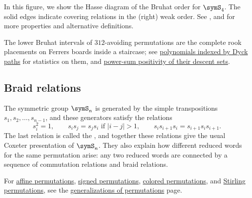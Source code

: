\begin{figure}
\end{figure}

In this figure, we show the Hasse diagram of the Bruhat order for $\symS_4$.
The solid edges indicate covering relations in the (right) weak order.
See \cite[Ch.~10.5]{Fulton1997}, \cite[Exs.~183 and 185]{StanleyEC1}
and \cite[Chs.~2--3]{Bjorner2005} for more properties
and alternative definitions.

The lower Bruhat intervals of $312$-avoiding permutations are the complete rook
placements on Ferrers boards inside a staircase; see
\hyperref[dyckPathBruhatPolynomials]{polynomials indexed by Dyck paths} for
statistics on them, and \hyperref[bruhatIntervalPsiPositive]{power-sum
positivity of their descent sets}.


\subsection[braidRelations]{Braid relations}


The symmetric group $\symS_n$ is generated by the simple transpositions
$s_1, s_2, \dotsc, s_{n-1}$, and these generators satisfy the relations
\[
s_i^2 = 1,\qquad s_i s_j = s_j s_i \text{ if } |i-j| > 1,\qquad
s_i s_{i+1} s_i = s_{i+1} s_i s_{i+1}.
\]
The last relation is called the \label{braidRelation},
and together these
relations give the usual Coxeter presentation of $\symS_n$.
They also explain how different reduced words for the same permutation
arise: any two reduced words are connected by a sequence of commutation
relations and braid relations.




For \hyperref[notationAffinePermutations]{affine permutations},
\hyperref[permutationsTypeB]{signed permutations},
\hyperref[permutationsColored]{colored permutations},
and \hyperref[permutationsStirling]{Stirling permutations},
see the \hyperref[notationAffinePermutations]{generalizations of permutations} page.

